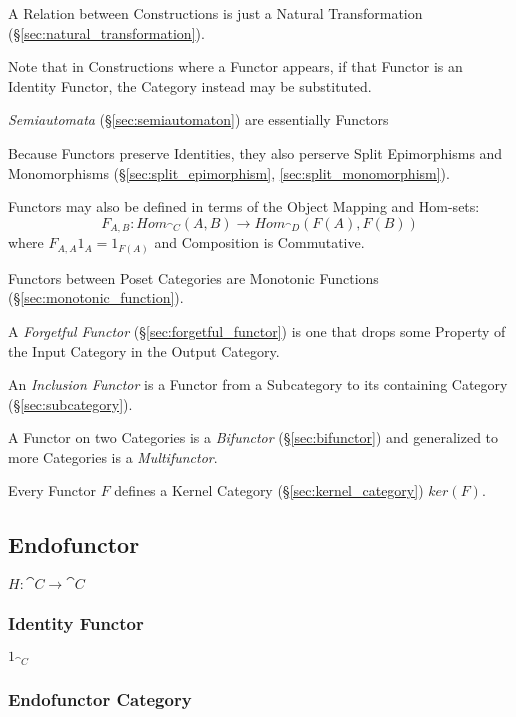 A Relation between Constructions is just a Natural Transformation
(\S\ref{sec:natural_transformation}).

\fist Note that in Constructions where a Functor appears, if
that Functor is an Identity Functor, the Category instead may be
substituted.

\fist \emph{Semiautomata} (\S\ref{sec:semiautomaton}) are essentially
Functors

Because Functors preserve Identities, they also perserve Split
Epimorphisms and Monomorphisms (\S\ref{sec:split_epimorphism},
\ref{sec:split_monomorphism}).

Functors may also be defined in terms of the Object Mapping and
Hom-sets:
\[
  F_{A,B} : Hom_{\cat{C}}(A,B) \rightarrow Hom_{\cat{D}}(F(A),F(B))
\]
where $F_{A,A}1_A = 1_{F(A)}$ and Composition is Commutative.

Functors between Poset Categories are Monotonic Functions
(\S\ref{sec:monotonic_function}).

A \emph{Forgetful Functor} (\S\ref{sec:forgetful_functor}) is one that
drops some Property of the Input Category in the Output Category.

An \emph{Inclusion Functor} is a Functor from a Subcategory to its
containing Category (\S\ref{sec:subcategory}).

A Functor on two Categories is a \emph{Bifunctor}
(\S\ref{sec:bifunctor}) and generalized to more Categories is a
\emph{Multifunctor}.

Every Functor $F$ defines a Kernel Category
(\S\ref{sec:kernel_category}) $ker(F)$.



\subsection{Endofunctor}\label{sec:endofunctor}

$H : \cat{C} \rightarrow \cat{C}$



\subsubsection{Identity Functor}\label{sec:identity_functor}

$1_{\cat{C}}$



\subsubsection{Endofunctor Category}\label{sec:endofunctor_category}

